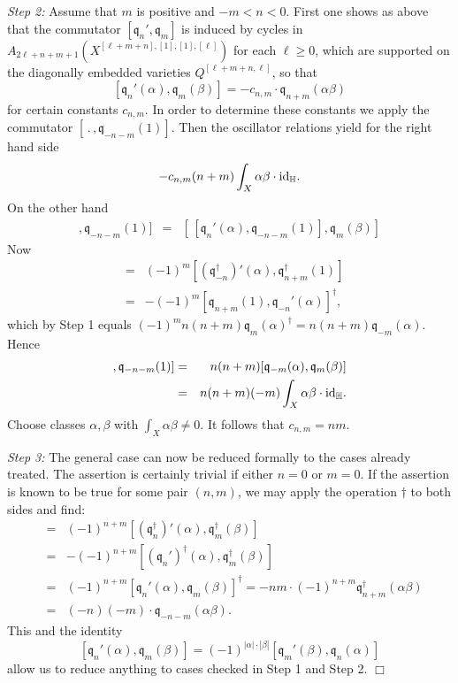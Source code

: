 \documentclass[twoside,11pt]{article}
\newcommand{\qed}{\hspace*{\fill}$\Box$\vspace{2ex}}
\newcommand{\IH}{{\mathbb H}}
\newcommand{\gothq}{{\mathfrak q}}
\newcommand{\qq}{\gothq}
\newcommand{\id}{{\rm id}}
\begin{document}
{\em Step 2:} Assume that $m$ is positive and $-m<n<0$. First one shows 
as above that the commutator $[\qq_n',\qq_m]$ is
induced by cycles in $A_{2\ell+n+m+1}(X^{[\ell+m+n],[1],[1],[\ell]})$ for
each $\ell\geq0$, which are supported on the diagonally embedded varieties
$Q^{[\ell+m+n,\ell]}$, so that
$$[\qq_n'(\alpha),\qq_m(\beta)]=-c_{n,m}\cdot \qq_{n+m}(\alpha\beta)$$
for certain constants $c_{n,m}$. In order to determine these constants
we apply the commutator $[\,.\,,\qq_{-n-m}(1)]$.
Then the oscillator relations yield for the right hand side  
$$-c_{n,m}(n+m)\int_X\alpha\beta\cdot\id_\IH.$$
On the other hand
\begin{eqnarray*}[\,[\qq_{n}'(\alpha),\qq_m(\beta)],\qq_{-n-m}(1)]&=&
[\,[\qq_{n}'(\alpha),\qq_{-n-m}(1)],\qq_m(\beta)]
\end{eqnarray*}
Now
\begin{eqnarray*}[\qq_{n}'(\alpha),\qq_{-n-m}(1)]&=&(-1)^{m}[(\qq_{-n}^\dagger)'(\alpha),\qq_{n+m}^\dagger(1)]\\
&=&-(-1)^m[\qq_{n+m}(1),\qq_{-n}'(\alpha)]^\dagger,
\end{eqnarray*}
which by Step 1 equals $(-1)^mn(n+m)\qq_m(\alpha)^\dagger=n(n+m)\qq_{-m}(\alpha)$.
Hence
\begin{eqnarray*}
[\,[\qq_{n}'(\alpha),\qq_m(\beta)],\qq_{-n-m}(1)]&=&n(n+m)[\qq_{-m}(\alpha),
\qq_m(\beta)]\\
&=&n(n+m)(-m)\int_X\alpha\beta\cdot\id_\IH.
\end{eqnarray*}
Choose classes $\alpha,\beta$ with $\int_X\alpha\beta\neq0$. It follows that
$c_{n,m}=nm$.


{\em Step 3:} The general case can now be reduced formally to the cases already treated. The assertion is certainly trivial if either $n=0$ or $m=0$.
If the assertion is known to be true for some pair $(n,m)$, we may apply the
operation $\dagger$ to both sides and find:
\begin{eqnarray*}[\qq_{-n}'(\alpha),\qq_{-m}(\beta)]
&=&(-1)^{n+m}[(\qq_n^\dagger)'(\alpha),\qq^\dagger_m(\beta)]\\
&=&-(-1)^{n+m}[(\qq_n')^\dagger(\alpha),\qq_m^\dagger(\beta)]\\
&=&(-1)^{n+m}[\qq_n'(\alpha),\qq_m(\beta)]^\dagger=-nm\cdot(-1)^{n+m}\qq_{n+m}^\dagger(\alpha\beta)\\
&=&(-n)(-m)\cdot\qq_{-n-m}(\alpha\beta).
\end{eqnarray*}
This and the identity
$$[\qq_n'(\alpha),\qq_m(\beta)]=(-1)^{|\alpha|\cdot|\beta|}[\qq_m'(\beta),\qq_n(\alpha)]$$
allow us to reduce anything to cases checked in Step 1 and Step 2.
\qed
\end{document}
